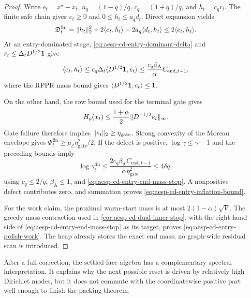 \begin{proof}
Write $e_t=x^\star-x_t$, $a_q=(1-q)/q$,
$c_q=(1+q)/q$, and $h_t=c_qr_t$.  The finite safe chain gives
$e_t\geq0$ and $0\leq h_t\leq a_qd_t$.  Direct expansion yields
\begin{equation*}
 \mathfrak D_t^{\mathrm{fin}}
 =\lVert h_t\rVert_2^2+2\langle e_t,h_t\rangle
   -2a_q\langle d_t,h_t\rangle
 \leq2\langle e_t,h_t\rangle.
\end{equation*}
At an entry-dominated stage,
\cref{eq:aesp-cd-entry-dominant-delta} and
$r_t\leq\Delta_tD^{1/2}\mathbf{1}$ give
\begin{equation*}
 \langle e_t,h_t\rangle
 \leq c_q\Delta_t\langle D^{1/2}\mathbf{1},e_t\rangle
 \leq\frac{c_q\beta_{\mathrm A}}\alpha
       C_{\mathrm{end},t-1},
\end{equation*}
where the RPPR mass bound gives
$\langle D^{1/2}\mathbf{1},e_t\rangle\leq1$.

On the other hand, the row bound used for the terminal gate gives
\begin{equation*}
 H_\rho(x_t)
 \leq\frac{1+\alpha}{2}
       \lVert D^{-1/2}e_t\rVert_\infty.
\end{equation*}
Gate failure therefore implies
$\lVert e_t\rVert_2\geq\eta_{\mathrm{gate}}$.  Strong convexity of the Moreau
envelope gives
$\Phi_t^{\mathrm{fin}}\geq
\mu_{\mathcal E}\eta_{\mathrm{gate}}^2/2$.  If the defect is positive,
$\log\gamma\leq\gamma-1$ and the preceding bounds imply
\begin{equation*}
 \log\gamma_t^{\mathrm{fin}}
 \leq
 \frac{2c_q\beta_{\mathrm A}C_{\mathrm{end},t-1}}
      {\alpha\eta_{\mathrm{gate}}^2}
 \leq4\delta q,
\end{equation*}
using $c_q\leq2/q$, $\beta_{\mathrm A}\leq1$, and
\cref{eq:aesp-cd-entry-end-mass-stop}.  A nonpositive defect contributes
zero, and summation proves
\cref{eq:aesp-cd-entry-inflation-bound}.

For the work claim, the proximal warm-start mass is at most
$2(1-\alpha)\sqrt V$.  The greedy mass contraction used in
\cref{cor:aesp-cd-dual-inner-stop}, with the right-hand side of
\cref{eq:aesp-cd-entry-end-mass-stop} as its target, proves
\cref{eq:aesp-cd-entry-polish-work}.  The heap already stores the exact end
mass; no graph-wide residual scan is introduced.
\end{proof}

After a full correction, the settled-face algebra has a complementary
spectral interpretation.  It explains why the next possible reset is driven
by relatively high Dirichlet modes, but it does not commute with the
coordinatewise positive part well enough to finish the packing theorem.

